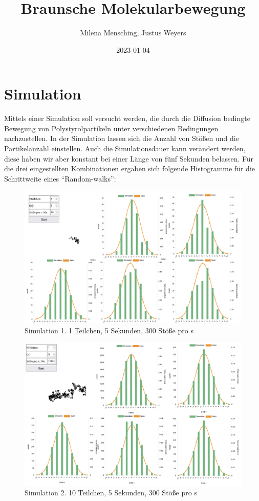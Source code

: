 \documentclass[
  9pt,
]{article}
\title{Braunsche Molekularbewegung}
\author{Milena Mensching, Justus Weyers}
\date{2023-01-04}
\begin{document}
\maketitle

\hypertarget{simulation}{%
\section{Simulation}\label{simulation}}

Mittels einer Simulation soll versucht werden, die durch die Diffusion
bedingte Bewegung von Polystyrolpartikeln unter verschiedenen
Bedingungen nachzustellen. In der Simulation lassen sich die Anzahl von
Stößen und die Partikelanzahl einstellen. Auch die Simulationsdauer kann
verändert werden, diese haben wir aber konstant bei einer Länge von fünf
Sekunden belassen. Für die drei eingestellten Kombinationen ergaben sich
folgende Histogramme für die Schrittweite eines ``Random-walks'':

\begin{figure}
\centering
\includegraphics[width=\textwidth,height=0.1\textheight]{Daten/a.png}
\caption{Simulation 1. 1 Teilchen, 5 Sekunden, 300 Stöße pro s}
\end{figure}

\begin{figure}
\centering
\includegraphics[width=\textwidth,height=0.1\textheight]{Daten/b.png}
\caption{Simulation 2. 10 Teilchen, 5 Sekunden, 300 Stöße pro s}
\end{figure}
\end{document}
